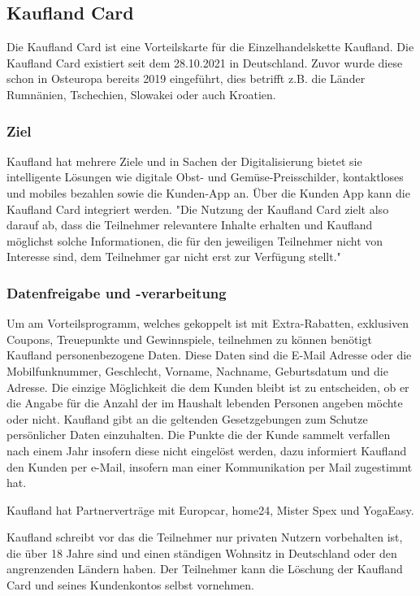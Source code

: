 \subsection{Kaufland Card}
Die Kaufland Card ist eine Vorteilskarte für die Einzelhandelskette Kaufland. Die Kaufland Card existiert seit dem 28.10.2021 in Deutschland. Zuvor wurde diese schon in Osteuropa bereits 2019 eingeführt, dies betrifft z.B. die Länder Rumnänien, Tschechien, Slowakei oder auch Kroatien. 

\subsubsection{Ziel}
Kaufland hat mehrere Ziele und in Sachen der Digitalisierung bietet sie intelligente Lösungen wie digitale Obst- und Gemüse-Preisschilder, kontaktloses und mobiles bezahlen sowie die Kunden-App an. Über die Kunden App kann die Kaufland Card integriert werden. \label{Kaufland_Ziele}
"Die Nutzung der Kaufland Card zielt also darauf ab, dass die Teilnehmer relevantere Inhalte erhalten und Kaufland möglichst solche Informationen, die für den jeweiligen Teilnehmer nicht von Interesse sind, dem Teilnehmer gar nicht erst zur Verfügung stellt." \label{Kaufland_Datenschutz}

\subsubsection{Datenfreigabe und -verarbeitung}
Um am Vorteilsprogramm, welches gekoppelt ist mit Extra-Rabatten, exklusiven Coupons, Treuepunkte und Gewinnspiele, teilnehmen zu können benötigt Kaufland personenbezogene Daten. Diese Daten sind  die E-Mail Adresse oder die Mobilfunknummer, Geschlecht, Vorname, Nachname, Geburtsdatum und die Adresse. Die einzige Möglichkeit die dem Kunden bleibt ist zu entscheiden, ob er die Angabe für die Anzahl der im Haushalt lebenden Personen angeben möchte oder nicht. 
Kaufland gibt an die geltenden Gesetzgebungen zum Schutze persönlicher Daten einzuhalten. 
Die Punkte die der Kunde sammelt verfallen nach einem Jahr insofern diese nicht eingelöst werden, dazu informiert Kaufland den Kunden per e-Mail, insofern man einer Kommunikation per Mail zugestimmt hat. 

Kaufland hat Partnerverträge mit Europcar, home24, Mister Spex und YogaEasy.
\label{Kaufland_FAQ}

Kaufland schreibt vor das die Teilnehmer nur privaten Nutzern vorbehalten ist, die über 18 Jahre sind und einen ständigen Wohnsitz in Deutschland oder den angrenzenden Ländern haben.
Der Teilnehmer kann die Löschung der Kaufland Card und seines Kundenkontos selbst vornehmen. \label{Kaufland_Datenschutz}

